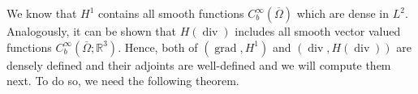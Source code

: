 \documentclass[12pt,a4paper]{article}
\numberwithin{equation}{subsection}
\numberwithin{lemma}{subsection}
\theoremstyle{definition}
\DeclareMathOperator{\diver}{div}
\DeclareMathOperator{\grad}{grad}
\DeclareMathOperator{\tr}{tr}
\newcommand{\real}{\mathbb{R}}
\begin{document}
    



We know that $H^1$ contains all smooth functions 
$C_b^\infty(\overline{\Omega})$ which are dense in $L^2$. 
Analogously, it can be shown that $H(\diver)$ includes all smooth 
vector valued functions $C_b^\infty(\overline{\Omega};\real^3)$. Hence, 
both of $(\grad,H^1)$ and $(\diver,H(\diver))$ are densely defined and 
their adjoints are well-defined and we will compute them next. To do so, 
we need the following theorem.
\end{document}
